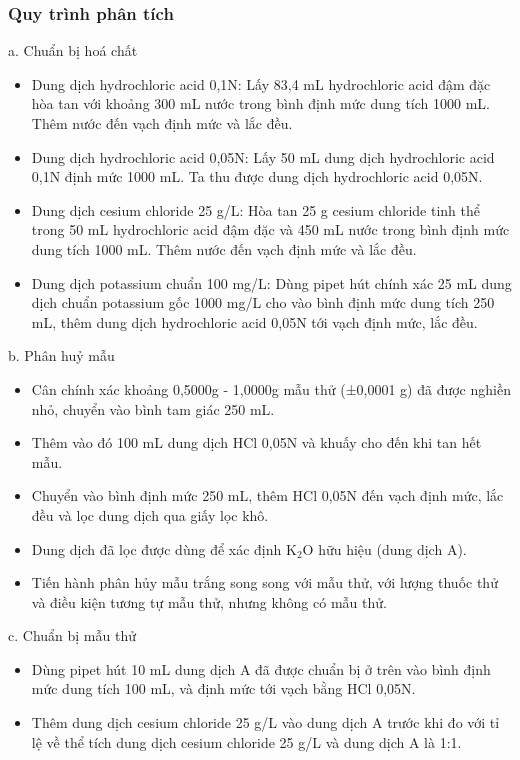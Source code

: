 \subsubsection{Quy trình phân tích}

a. Chuẩn bị hoá chất
\begin{itemize}
  \item Dung dịch hydrochloric acid 0,1N: Lấy 83,4 mL hydrochloric acid đậm đặc hòa tan với khoảng 300 mL nước trong bình định mức dung tích 1000 mL. 
  Thêm nước đến vạch định mức và lắc đều.
  \item Dung dịch hydrochloric acid 0,05N: Lấy 50 mL dung dịch hydrochloric acid 0,1N định mức 1000 mL. Ta thu được dung dịch hydrochloric acid 0,05N.
  \item Dung dịch cesium chloride 25 g/L: Hòa tan 25 g cesium chloride tinh thể trong 50 mL hydrochloric acid đậm đặc và 450 mL nước trong bình định mức dung tích 1000 mL. 
  Thêm nước đến vạch định mức và lắc đều.
  \item Dung dịch potassium chuẩn 100 mg/L: Dùng pipet hút chính xác 25 mL dung dịch chuẩn potassium gốc 1000 mg/L cho vào bình định mức dung tích 250 mL, thêm dung dịch hydrochloric acid 0,05N tới vạch định mức, lắc đều.
\end{itemize}

b. Phân huỷ mẫu
\begin{itemize}
  \item Cân chính xác khoảng 0,5000g - 1,0000g mẫu thử (±0,0001 g) đã được nghiền nhỏ, chuyển vào bình tam giác 250 mL.
  \item Thêm vào đó 100 mL dung dịch \(\mathrm{HCl}\) 0,05N và khuấy cho đến khi tan hết mẫu.
  \item Chuyển vào bình định mức 250 mL, thêm \(\mathrm{HCl}\) 0,05N đến vạch định mức, lắc đều và lọc dung dịch qua giấy lọc khô.
  \item Dung dịch đã lọc được dùng để xác định \(\mathrm{K_2O}\) hữu hiệu (dung dịch A).
  \item Tiến hành phân hủy mẫu trắng song song với mẫu thử, với lượng thuốc thử và điều kiện tương tự mẫu thử, nhưng không có mẫu thử.
\end{itemize}

c. Chuẩn bị mẫu thử
\begin{itemize}
  \item Dùng pipet hút 10 mL dung dịch A đã được chuẩn bị ở trên vào bình định mức dung tích 100 mL, và định mức tới vạch bằng \(\mathrm{HCl}\) 0,05N.
  \item Thêm dung dịch cesium chloride 25 g/L vào dung dịch A trước khi đo với tỉ lệ về thể tích dung dịch cesium chloride 25 g/L và dung dịch A là 1:1.
\end{itemize}

